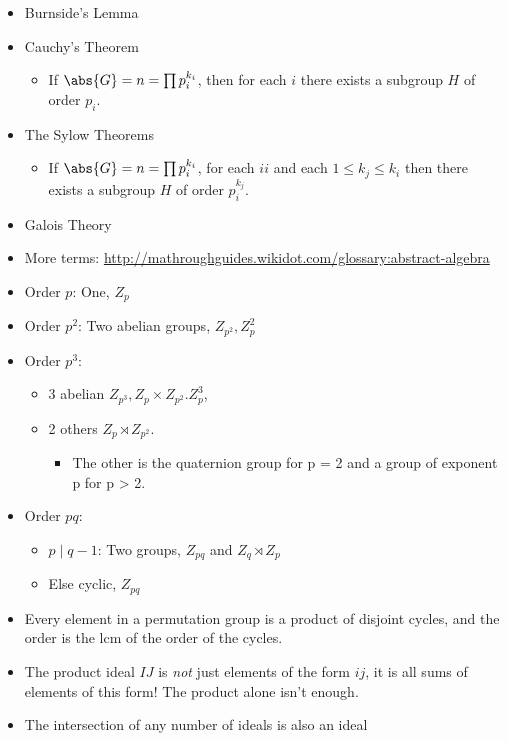 \begin{itemize}
\item
  Burnside's Lemma
\item
  Cauchy's Theorem

  \begin{itemize}
  \tightlist
  \item
    If \(\abs{G} = n = \prod p_i^{k_i}\), then for each \(i\) there
    exists a subgroup \(H\) of order \(p_i\).
  \end{itemize}
\item
  The Sylow Theorems

  \begin{itemize}
  \tightlist
  \item
    If \(\abs{G} = n = \prod p_i^{k_i}\), for each \(ii\) and each
    \(1 \leq k_j \leq k_i\) then there exists a subgroup \(H\) of order
    \(p_i^{k_j}\).
  \end{itemize}
\item
  Galois Theory
\item
  More terms:
  \url{http://mathroughguides.wikidot.com/glossary:abstract-algebra}
\item
  Order \(p\): One, \(Z_p\)
\item
  Order \(p^2\): Two abelian groups, \(Z_{p^2}, Z_p^2\)
\item
  Order \(p^3\):

  \begin{itemize}
  \item
    3 abelian \(Z_{p^3}, Z_p \times Z_{p^2}. Z_p^3\),
  \item
    2 others \(Z_p \rtimes Z_{p^2}\).

    \begin{itemize}
    \tightlist
    \item
      The other is the quaternion group for p = 2 and a group of
      exponent p for p \textgreater{} 2.
    \end{itemize}
  \end{itemize}
\item
  Order \(pq\):

  \begin{itemize}
  \tightlist
  \item
    \(p \mid q-1\): Two groups, \(Z_{pq}\) and \(Z_q \rtimes Z_p\)
  \item
    Else cyclic, \(Z_{pq}\)
  \end{itemize}
\item
  Every element in a permutation group is a product of disjoint cycles,
  and the order is the lcm of the order of the cycles.
\item
  The product ideal \(IJ\) is \emph{not} just elements of the form
  \(ij\), it is all sums of elements of this form! The product alone
  isn't enough.
\item
  The intersection of any number of ideals is also an ideal
\end{itemize}

